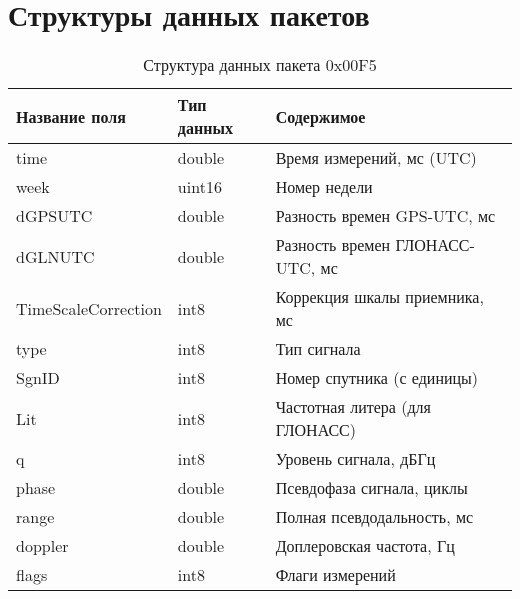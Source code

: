 \chapter{Структуры данных пакетов}
\label{cha:appendix6}
\begin{longtable}[c]{|lll|}
	\caption{Структура данных пакета 0x00F5} \label{tab:formatf5}\\
	\hline
	Название поля & Тип данных & Содержимое \\
	\hline
	time & double & Время измерений, мс (UTC) \\
	week & uint16 & Номер недели \\
	dGPSUTC & double & Разность времен GPS-UTC, мс \\
	dGLNUTC & double & Разность времен ГЛОНАСС-UTC, мс \\
	TimeScaleCorrection & int8 & Коррекция шкалы приемника, мс \\
	type & int8 & Тип сигнала \\
	SgnID & int8 & Номер спутника (с единицы) \\
	Lit & int8 & Частотная литера (для ГЛОНАСС) \\
	q & int8 & Уровень сигнала, дБГц \\
	phase & double & Псевдофаза сигнала, циклы \\
	range & double & Полная псевдодальность, мс \\
	doppler & double & Доплеровская частота, Гц \\
	flags & int8 & Флаги измерений \\
	\hline	
\end{longtable}
\newpage
